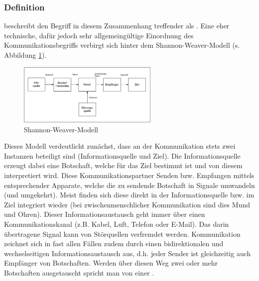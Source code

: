\subsubsection{Definition}
\citep{duden} beschreibt den Begriff in diesem Zusammenhang  treffender als .
Eine eher technische, dafür jedoch sehr allgemeingültige Einordnung des Kommunikationsbegriffs verbirgt sich hinter dem Shannon-Weaver-Modell (s. Abbildung \ref{fig:shannon-weaver-modell}).

\begin{figure}[htbp]
	\centering
	\includegraphics[width=0.6\textwidth]{abb/shannon-weaver-modell.jpg}
	\caption{Shannon-Weaver-Modell}
	\label{fig:shannon-weaver-modell}
\end{figure}

Dieses Modell verdeutlicht zunächst, dass an der Kommunikation stets zwei Instanzen beteiligt sind (Informationsquelle und Ziel).
Die Informationsquelle erzeugt dabei eine Botschaft, welche für das Ziel bestimmt ist und von diesem interpretiert wird.
Diese Kommunikationspartner Senden bzw. Empfangen mittels entsprechender Apparate, welche die zu sendende Botschaft in Signale umwandeln (und umgekehrt).
Meist finden sich diese  direkt in der Informationsquelle bzw. im Ziel integriert wieder (bei zwischenmenschlicher Kommunikation sind dies Mund und Ohren).
Dieser Informationsaustausch geht immer über einen Kommunikationskanal (z.B. Kabel, Luft, Telefon oder E-Mail). Das darin übertragene Signal kann von Störquellen verfremdet werden.
Kommunikation zeichnet sich in fast allen Fällen zudem durch einen bidirektionalen und wechselseitigen Informationsaustausch aus, d.h. jeder Sender ist gleichzeitig auch Empfänger von Botschaften.
Werden über diesen Weg zwei oder mehr Botschaften ausgetauscht spricht man von einer  \citep{human-hacking}.

